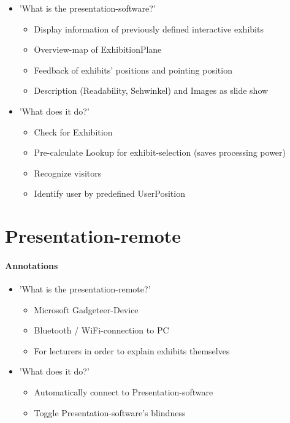 \begin{itemize}
	\item 'What is the presentation-software?'
	\begin{itemize}
		\item Display information of previously defined interactive exhibits
		\item Overview-map of ExhibitionPlane
		\item Feedback of exhibits' positions and pointing position
		\item Description (Readability, Sehwinkel) and Images as slide show
	\end{itemize}
	\item 'What does it do?'
	\begin{itemize}
		\item Check for Exhibition
		\item Pre-calculate Lookup for exhibit-selection (saves processing power)
		\item Recognize visitors
		\item Identify user by predefined UserPosition 
	\end{itemize}
\end{itemize}


\section{Presentation-remote}
\label{implementation_remote}

\paragraph{Annotations}

\begin{itemize}
	\item 'What is the presentation-remote?'
	\begin{itemize}
		\item Microsoft Gadgeteer-Device
		\item Bluetooth / WiFi-connection to PC
		\item For lecturers in order to explain exhibits themselves
	\end{itemize}
	\item 'What does it do?'
	\begin{itemize}
		\item Automatically connect to Presentation-software
		\item Toggle Presentation-software's blindness
	\end{itemize}
\end{itemize}

